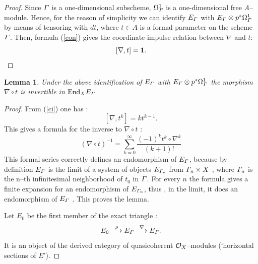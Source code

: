 \documentclass[12pt]{article}
\newtheorem{lemma}[theorem]{Lemma}
\def\lto{\longrightarrow}
\def\o#1{{\cal O}_{#1}}
\begin{document}
\begin{proof}
Since ${\mit\Gamma}$ is a one-dimensional subscheme, $\Omega^1_{\mit\Gamma}$ is a one-dimensional free {\it A}--module. Hence, for the reason of simplicity we can 
identify $E_{\mit\Gamma}$ with $E_{\mit\Gamma}\otimes p^*\Omega^1_{\mit\Gamma}$ by means of tensoring with $dt$, where $t\in A$ is a formal parameter on the scheme ${\mit\Gamma}$. 
Then, formula (\ref{con}) gives the coordinate-impulse relation between $\nabla$ and $t$:
\begin{equation}\label{ci}
[\nabla, t ]={\bf 1}.
\end{equation}
\end{proof}

\begin{lemma}\label{inv}
Under the above identification of $E_{\mit\Gamma}$ with $E_{\mit\Gamma}\otimes p^*\Omega^1_{\mit\Gamma}$ the morphism $\nabla{\circ}t$ is invertible in ${\rm End}_X E_{\mit\Gamma}$
\end{lemma}
\begin{proof}
From (\ref{ci}) one has :
$$
[\nabla, t ^k]=k t^{k-1}.
$$
This gives a formula for the inverse to $\nabla\circ t $ :
$$
(\nabla{\circ}t)^{-1}=\sum_{k=0}^{\infty}\frac{(-1)^k t^k{\circ}\nabla^k}{(k+1)!}
$$
This formal series correctly defines an endomorphism of $E_{\mit\Gamma}$, because by definition $E_{\mit\Gamma}$ is the limit of a system of objects $E_{\mit\Gamma_n}$ from 
${\mit\Gamma}_n\times X$ , where ${\mit\Gamma}_n$ is the n--th infinitesimal neighborhood of $t_0$ in ${\mit\Gamma}$. For every $n$ the formula gives a finite expansion for an  endomorphism of $E_{\mit\Gamma_n}$, thus , in the limit, it does an endomorphism of $E_{\mit\Gamma}$ . This proves the lemma.
\bigskip

Let $E_0$ be the first member of the exact triangle :
$$
E_0\stackrel{\rho}{\lto}E_{\mit\Gamma}\stackrel{\nabla}{\lto}
E_{\mit\Gamma}.
$$
It is an object of the derived category of quasicoherent ${\o X}$--modules (`horizontal sections of $E$').
\end{proof}
\end{document}
